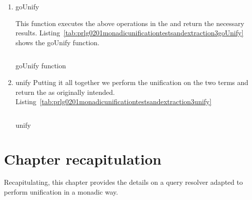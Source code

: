 \documentclass[thesis-solanki.tex]{subfiles}
\begin{document}
\begin{enumerate}
\item{goUnify}

This function executes the above operations in the  and return the necessary results. 
Listing~\ref{tab:prlg0201monadicunificationtestsandextraction3goUnify} shows the goUnify function.

\begin{code-list}[H]
  \begin{singlespace}
    \inputminted[linenos,firstline=95, lastline=107]{haskell}{haskell-proto2-monadic-unification-tests-and-extraction.hs}
  \end{singlespace}
\caption{goUnify function}
\label{tab:prlg0201monadicunificationtestsandextraction3goUnify}
\end{code-list}

\item{unify}
Putting it all together we perform the unification on the two terms and return the  as originally intended. 
Listing~\ref{tab:prlg0201monadicunificationtestsandextraction3unify}

\begin{code-list}[H]
  \begin{singlespace}
    \inputminted[linenos,firstline=121, lastline=130]{haskell}{haskell-proto2-monadic-unification-tests-and-extraction.hs}
  \end{singlespace}
\caption{unify}
\label{tab:prlg0201monadicunificationtestsandextraction3unify}
\end{code-list}


\end{enumerate}



\section{Chapter recapitulation}
Recapitulating, this chapter provides the details on a  query resolver adapted to perform unification in a monadic way. 


\ifMain
\begin{scope}
  \nolinenumbers
  \enotesize
  \par
  \begin{singlespace}
  \setlength{\parskip}{12pt plus 2pt minus 1pt}
  \theendnotes
  \par
  \end{singlespace}
\end{scope}
\fi
\end{document}
